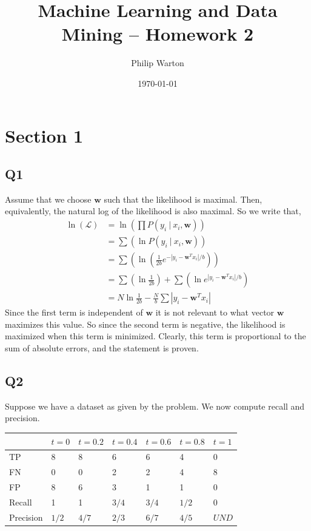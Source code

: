 \documentclass{article}
\theoremstyle{definition}
\begin{document}
\title{Machine Learning and Data Mining -- Homework 2}
\author{Philip Warton}
\date{\today}
\maketitle

\section*{Section 1}
    \subsection*{Q1}
Assume that we choose $\bm w$ such that the likelihood is maximal. Then, equivalently,
the natural log of the likelihood is also maximal. So we write that,
\begin{align*}
    \ln(\mathcal{L}) &= \ln\left(\prod P(y_i \ | \ x_i, \bm w)\right) \\
    &= \sum \left(
        \ln P(y_i \ | \ x_i, \bm w)
    \right) \\
    &= \sum \left(
        \ln \left(
            \frac{1}{2b}e^{-|y_i-\bm w^T x_i|/b}
        \right)
    \right) \\
    &= \sum(\ln \frac{1}{2b}) + \sum\left(
        \ln e^{|y_i - \bm w^T x_i|/b}
    \right)\\
    &= N\ln\frac{1}{2b} - \frac{N}{b} \sum |y_i - \bm w^T x_i|
\end{align*}
Since the first term is independent of $\bm w$ it is not relevant to what vector $\bm w$ maximizes this value.
So since the second term is negative, the likelihood is maximized when this term is minimized. Clearly,
this term is proportional to the sum of absolute errors, and the statement is proven.
    \subsection*{Q2}
Suppose we have a dataset as given by the problem. We now compute recall and precision.
\begin{center}
    \begin{tabular}{l|llllll}
              & $t=0$         & $t=0.2$        & $t=0.4$        & $t=0.6$       & $t=0.8$       & $t=1$         \\
\hline
    TP        & 8             & 8              & 6              & 6             & 4             & 0             \\
    FN        & 0             & 0              & 2              & 2             & 4             & 8             \\
    FP        & 8             & 6              & 3              & 1             & 1             & 0             \\
    Recall    & 1             & 1              & $3/4$  & $3/4$ & $1/2$ & $0$ \\
    Precision & $1/2$ & $4/7$ & $2/3$ & $6/7$ & $4/5$ & $UND$            
    \end{tabular}
\end{center}
\end{document}
